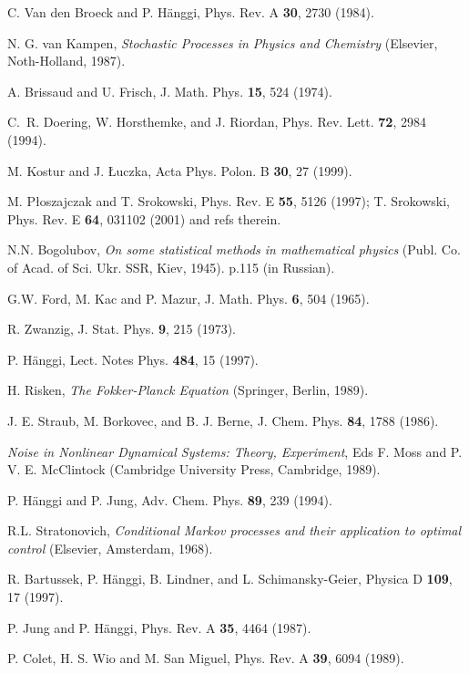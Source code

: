 \documentclass[authoryear,draft,1p,times]{elsarticle}
\renewcommand{\=}{\stackrel{\mathrm{d}}{=}}
\begin{document}
\begin{thebibliography}{99}
 C. Van den Broeck and P. H\"anggi, Phys. Rev.  A {\bf 30}, 
2730 (1984).

 N. G. van Kampen, {\it Stochastic Processes in
Physics and Chemistry} (Elsevier, Noth-Holland, 1987).

 A. Brissaud and U. Frisch, J. Math. Phys. {\bf 15}, 524 (1974).

  C.~R. Doering, W. Horsthemke, and J. Riordan, Phys. Rev.
Lett.  {\bf 72},  2984 (1994).

%
 M. Kostur and J. \L uczka, Acta Phys. Polon. B 
{\bf 30}, 27 (1999).

  M. P\l oszajczak and T. Srokowski,
Phys. Rev. E {\bf 55},  5126 (1997); 
T. Srokowski, Phys. Rev. E {\bf 64}, 031102 (2001) and refs therein.

 N.N. Bogolubov, {\it  On some statistical methods in mathematical 
physics} (Publ. Co. of Acad. of Sci. Ukr. SSR, Kiev, 1945). p.115 (in Russian). 

 G.W. Ford, M. Kac and P. Mazur, J. Math. Phys. {\bf 6}, 504 (1965). 

 R. Zwanzig, J. Stat. Phys. {\bf 9}, 215 (1973). 

 P. H\"anggi, Lect. Notes  Phys. {\bf 484},  15 (1997).

  H. Risken, {\it The Fokker-Planck Equation} (Springer, 
Berlin, 1989).
%

 J. E. Straub, M. Borkovec, and B. J. Berne, 
J. Chem. Phys. {\bf 84}, 1788 (1986).

 {\it  Noise  in Nonlinear Dynamical Systems: Theory, Experiment},
Eds  F. Moss and P. V. E. McClintock 
    (Cambridge University Press, Cambridge, 1989).

P. H{\"a}nggi and P. Jung, Adv. Chem. Phys. {\bf 89}, 239 (1994).


 R.L. Stratonovich, {\it Conditional Markov processes and 
their application to optimal control} (Elsevier, Amsterdam, 1968). 

 R. Bartussek, P. H{\"a}nggi, B. Lindner, and L. Schimansky-Geier,
Physica D {\bf 109}, 17 (1997).

 P. Jung and  P. H\"anggi, Phys. Rev. A {\bf 35}, 4464 (1987).
 
 P. Colet, H. S. Wio and M. San Miguel, Phys. Rev. A {\bf 39}, 
6094 (1989). 


\end{thebibliography}
\end{document}
